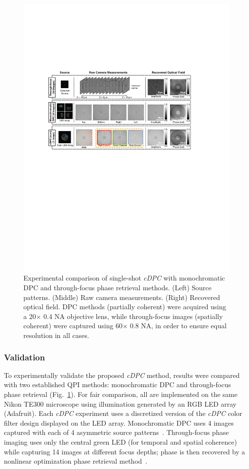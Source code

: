 \begin{figure}[bth]
\centering
\includegraphics[width=\textwidth]{figures/fig_cdpc_comparison.pdf}
\caption{\label{fig:spatialRes}
Experimental comparison of single-shot \textit{cDPC} with monochromatic DPC and through-focus phase retrieval methods. (Left) Source patterns. (Middle) Raw camera measurements. (Right) Recovered optical field. DPC methods (partially coherent) were acquired using a 20$\times$ 0.4 NA objective lens, while through-focus images (spatially coherent) were captured using 60$\times$ 0.8 NA, in order to ensure equal resolution in all cases.}
\end{figure}

\subsubsection{Validation}

To experimentally validate the proposed \textit{cDPC} method, results were compared with two established QPI methods: monochromatic DPC and through-focus phase retrieval (Fig.~\ref{fig:spatialRes}). For fair comparison, all are implemented on the same Nikon TE300 microscope using illumination generated by an RGB LED array (Adafruit). Each \textit{cDPC} experiment uses a discretized version of the \textit{cDPC} color filter design displayed on the LED array. Monochromatic DPC uses 4 images captured with each of 4 asymmetric source patterns~\cite{zijiMulti}. Through-focus phase imaging uses only the central green LED (for temporal and spatial coherence) while capturing 14 images at different focus depths; phase is then recovered by a nonlinear optimization phase retrieval method~\cite{JingsanSourceRecovery2016}.

